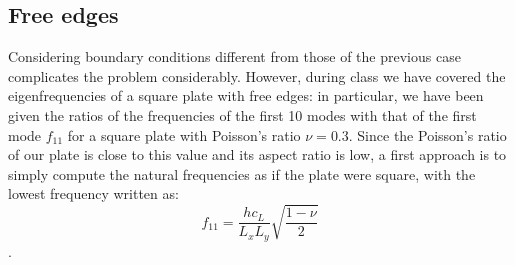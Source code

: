 \documentclass[a4paper]{article}
\begin{document}
\subsection{Free edges}

Considering boundary conditions different from those of the previous case complicates the problem considerably. However, during class we have covered the eigenfrequencies of a square plate with free edges: in particular, we have been given the ratios of the frequencies of the first 10 modes with that of the first mode $f_{11}$ for a square plate with Poisson's ratio $\nu = 0.3$. Since the Poisson's ratio of our plate is close to this value and its aspect ratio is low, a first approach is to simply compute the natural frequencies as if the plate were square, with the lowest frequency written as:
$$ f_{11} = \frac{hc_L}{L_x L_y} \sqrt{\frac{1-\nu}{2}} $$.
\cite{leissa}



\printbibliography
\end{document}
